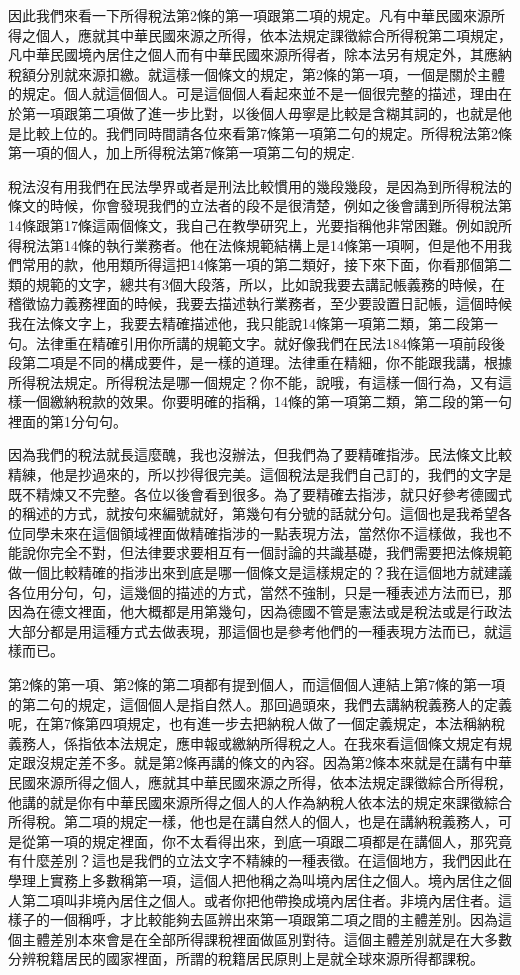 \documentclass[]{ctexbook}
\begin{document}
因此我們來看一下所得稅法第2條的第一項跟第二項的規定。凡有中華民國來源所得之個人，應就其中華民國來源之所得，依本法規定課徵綜合所得稅第二項規定，凡中華民國境內居住之個人而有中華民國來源所得者，除本法另有規定外，其應納稅額分別就來源扣繳。就這樣一個條文的規定，第2條的第一項，一個是關於主體的規定。個人就這個個人。可是這個個人看起來並不是一個很完整的描述，理由在於第一項跟第二項做了進一步比對，以後個人毋寧是比較是含糊其詞的，也就是他是比較上位的。我們同時間請各位來看第7條第一項第二句的規定。所得稅法第2條第一項的個人，加上所得稅法第7條第一項第二句的規定.

稅法沒有用我們在民法學界或者是刑法比較慣用的幾段幾段，是因為到所得稅法的條文的時候，你會發現我們的立法者的段不是很清楚，例如之後會講到所得稅法第14條跟第17條這兩個條文，我自己在教學研究上，光要指稱他非常困難。例如說所得稅法第14條的執行業務者。他在法條規範結構上是14條第一項啊，但是他不用我們常用的款，他用類所得這把14條第一項的第二類好，接下來下面，你看那個第二類的規範的文字，總共有3個大段落，所以，比如說我要去講記帳義務的時候，在稽徵協力義務裡面的時候，我要去描述執行業務者，至少要設置日記帳，這個時候我在法條文字上，我要去精確描述他，我只能說14條第一項第二類，第二段第一句。法律重在精確引用你所講的規範文字。就好像我們在民法184條第一項前段後段第二項是不同的構成要件，是一樣的道理。法律重在精細，你不能跟我講，根據所得稅法規定。所得稅法是哪一個規定？你不能，說哦，有這樣一個行為，又有這樣一個繳納稅款的效果。你要明確的指稱，14條的第一項第二類，第二段的第一句裡面的第1分句句。

因為我們的稅法就長這麼醜，我也沒辦法，但我們為了要精確指涉。民法條文比較精練，他是抄過來的，所以抄得很完美。這個稅法是我們自己訂的，我們的文字是既不精煉又不完整。各位以後會看到很多。為了要精確去指涉，就只好參考德國式的稱述的方式，就按句來編號就好，第幾句有分號的話就分句。這個也是我希望各位同學未來在這個領域裡面做精確指涉的一點表現方法，當然你不這樣做，我也不能說你完全不對，但法律要求要相互有一個討論的共識基礎，我們需要把法條規範做一個比較精確的指涉出來到底是哪一個條文是這樣規定的？我在這個地方就建議各位用分句，句，這幾個的描述的方式，當然不強制，只是一種表述方法而已，那因為在德文裡面，他大概都是用第幾句，因為德國不管是憲法或是稅法或是行政法大部分都是用這種方式去做表現，那這個也是參考他們的一種表現方法而已，就這樣而已。

第2條的第一項、第2條的第二項都有提到個人，而這個個人連結上第7條的第一項的第二句的規定，這個個人是指自然人。那回過頭來，我們去講納稅義務人的定義呢，在第7條第四項規定，也有進一步去把納稅人做了一個定義規定，本法稱納稅義務人，係指依本法規定，應申報或繳納所得稅之人。在我來看這個條文規定有規定跟沒規定差不多。就是第2條再講的條文的內容。因為第2條本來就是在講有中華民國來源所得之個人，應就其中華民國來源之所得，依本法規定課徵綜合所得稅，他講的就是你有中華民國來源所得之個人的人作為納稅人依本法的規定來課徵綜合所得稅。第二項的規定一樣，他也是在講自然人的個人，也是在講納稅義務人，可是從第一項的規定裡面，你不太看得出來，到底一項跟二項都是在講個人，那究竟有什麼差別？這也是我們的立法文字不精練的一種表徵。在這個地方，我們因此在學理上實務上多數稱第一項，這個人把他稱之為叫境內居住之個人。境內居住之個人第二項叫非境內居住之個人。或者你把他帶換成境內居住者。非境內居住者。這樣子的一個稱呼，才比較能夠去區辨出來第一項跟第二項之間的主體差別。因為這個主體差別本來會是在全部所得課稅裡面做區別對待。這個主體差別就是在大多數分辨稅籍居民的國家裡面，所謂的稅籍居民原則上是就全球來源所得都課稅。
\end{document}
